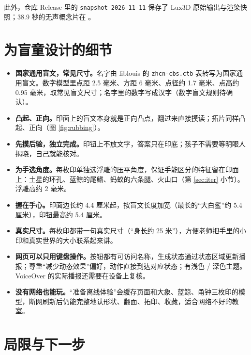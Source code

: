 \documentclass[UTF8,a4paper,zihao=5,fontset=none]{ctexart}
\begin{document}
此外，仓库 Release 里的 \texttt{snapshot-2026-11-11} 保存了 Lux3D 原始输出与渲染快照；38.9 秒的无声概念片在 。

\section{为盲童设计的细节}\label{sec:blind}

\begin{itemize}[leftmargin=1.4em,itemsep=4pt]
  \item \textbf{国家通用盲文，常见尺寸。}名字由 liblouis 的 \texttt{zhcn-cbs.ctb} 表转写为国家通用盲文。数字模型里点距 2.5 毫米、方距 6 毫米、点径约 1.7 毫米、点高约 0.95 毫米，取常见盲文尺寸；名字里的数字写成汉字（数字盲文规则待确认）。
  \item \textbf{凸起、正向。}印面上的盲文本身就是正向凸点，翻过来直接摸读；拓片同样凸起、正向（图 \ref{fig:rubbing}）。
  \item \textbf{先摸后验，独立完成。}印钮上不放文字，答案只在印底；孩子不需要等明眼人揭晓，自己就能核对。
  \item \textbf{为手选角度。}每枚印单独选浮雕的压平角度，保证手能区分的特征留在印面上：土星的环孔、蓝鲸的尾鳍、蚂蚁的六条腿、火山口（第 \ref{sec:iter} 小节）。浮雕高约 2 毫米。
  \item \textbf{握在手心。}印面边长约 4.4 厘米起，按盲文长度加宽（最长的“大白鲨”约 5.4 厘米），印钮最高约 5.4 厘米。
  \item \textbf{真实尺寸。}每枚印都带一句真实尺寸（“身长约 25 米”），方便老师把手里的小印和真实世界的大小联系起来讲。
  \item \textbf{网页可以只用键盘操作。}按钮都有可访问名称，生成状态通过状态区域更新播报；尊重“减少动态效果”偏好，动作直接到达对应状态；有浅色 / 深色主题。VoiceOver 的实际播报还需要在设备上复核。
  \item \textbf{没有网络也能玩。}“准备离线体验”会缓存页面和大象、蓝鲸、甬钟三枚印的模型，断网刷新后仍能完整地认形状、翻面、拓印、收藏，适合网络不好的教室。
\end{itemize}

\section{局限与下一步}\label{sec:next}
\end{document}
